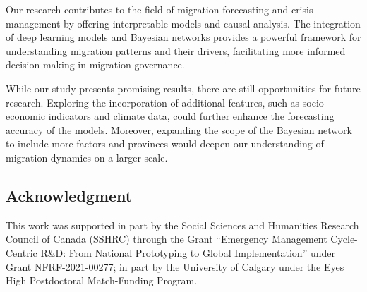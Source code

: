 \documentclass[conference]{IEEEtran}
\begin{document}
	Our research contributes to the field of migration forecasting and crisis management by offering interpretable models and causal analysis. The integration of deep learning models and Bayesian networks provides a powerful framework for understanding migration patterns and their drivers, facilitating more informed decision-making in migration governance.
	
	While our study presents promising results, there are still opportunities for future research. Exploring the incorporation of additional features, such as socio-economic indicators and climate data, could further enhance the forecasting accuracy of the models. Moreover, expanding the scope of the Bayesian network to include more factors and provinces would deepen our understanding of migration dynamics on a larger scale.
	
	\subsection*{Acknowledgment}
	
	\begin{small}
		This work was supported in part by the Social Sciences and Humanities Research Council of Canada (SSHRC) through the Grant ``Emergency Management Cycle-Centric R\&D: From National Prototyping to Global Implementation'' under Grant NFRF-2021-00277; in part by the University of Calgary under the Eyes High Postdoctoral Match-Funding Program.
	\end{small}
	
	
	{\small
		
		
	}
	
\end{document}

